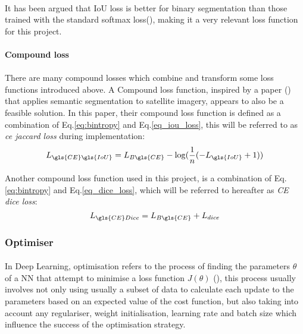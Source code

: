 \paragraph{}
It has been argued that \gls{IoU} loss is better for binary segmentation than those trained with the standard softmax loss(\cite{Rahman_2016}), making it a very relevant loss function for this project.
\paragraph{Compound loss}
\paragraph{}
There are many compound losses which combine and transform some loss functions introduced above. A Compound loss function, inspired by a paper (\cite{DBLP:journals/corr/IglovikovMO17}) that applies semantic segmentation to satellite imagery, appears to also be a feasible solution.
In this paper, their compound loss function is defined as a combination of Eq.\ref{eq:bintropy} and Eq.\ref{eq_iou_loss}, this will be referred to as \textit{ce jaccard loss} during implementation:
\begin{equation}
L_{\gls{CE} \gls{IoU}} = L_{B\gls{CE}} - \log (\frac{1}{n} (-L_{\gls{IoU}}+1))
\end{equation}

Another compound loss function used in this project, is a combination of Eq.\ref{eq:bintropy} and Eq.\ref{eq_dice_loss}, which will be referred to hereafter as \textit{\gls{CE} dice loss}:
\begin{equation}
L_{\gls{CE} Dice} = L_{B\gls{CE}} + L_{dice}
\end{equation}
\subsubsection{Optimiser} \label{optimiser}
\paragraph{}
In Deep Learning, optimisation refers to the process of finding the parameters $\theta$ of a \gls{NN} that attempt to minimise a loss function $J(\theta)$ (\cite{GoodBengCour16}), this process usually involves not only using usually a subset of data to calculate each update to the parameters based on an expected value of the cost function, but also taking into account any regulariser, weight initialisation, learning rate and batch size which influence the success of the optimisation strategy.

